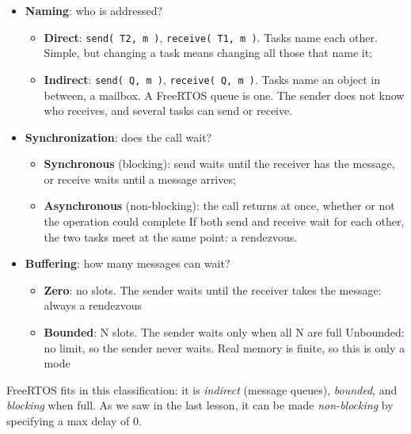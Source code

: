 \documentclass[a4paper,11pt]{article}
\begin{document}
\begin{itemize}
	\item\textbf{Naming}: who is addressed?
	      \begin{itemize}
		      \item \textbf{Direct}: \texttt{send( T2, m )}, \texttt{receive( T1, m )}. Tasks name each other. Simple, but changing a task means changing all those that name it;
		      \item \textbf{Indirect}: \texttt{send( Q, m )}, \texttt{receive( Q, m )}. Tasks name an object in between, a mailbox. A FreeRTOS queue is one. The sender does not know who receives, and several tasks can send or receive.
	      \end{itemize}
	\item \textbf{Synchronization}: does the call wait?
	      \begin{itemize}
		      \item \textbf{Synchronous} (blocking): send waits until the receiver has the message, or receive waits until a message
		            arrives;
		      \item \textbf{Asynchronous} (non-blocking): the call returns at once, whether or not the operation could complete
		            If both send and receive wait for each other, the two tasks meet at the same point: a rendezvous.
	      \end{itemize}
	\item \textbf{Buffering}: how many messages can wait?
	      \begin{itemize}
		      \item \textbf{Zero}: no slots. The sender waits until the receiver takes the message: always a rendezvous
		      \item \textbf{Bounded}: N slots. The sender waits only when all N are full
		            Unbounded: no limit, so the sender never waits. Real memory is finite, so this is only a mode
	      \end{itemize}
\end{itemize}

FreeRTOS fits in this classification: it is \textit{indirect} (message queues), \textit{bounded}, and \textit{blocking} when full. As we saw in the last lesson, it can be made \textit{non-blocking} by specifying a max delay of 0.
\end{document}
